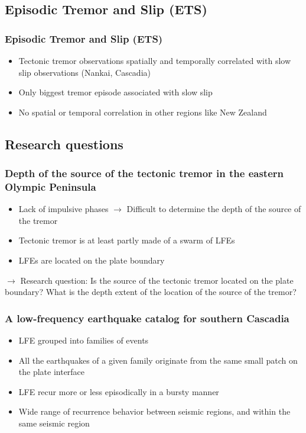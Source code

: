 \documentclass{beamer}
\begin{document}
	\subsection{Episodic Tremor and Slip (ETS)}

	\begin{frame}
		\frametitle{Episodic Tremor and Slip (ETS)}
		\begin{itemize}
			\item Tectonic tremor observations spatially and temporally correlated with slow slip observations (Nankai, Cascadia)
			\item Only biggest tremor episode associated with slow slip
			\item No spatial or temporal correlation in other regions like New Zealand
		\end{itemize}
	\end{frame}

	
	\subsection{Research questions}

	\begin{frame}
		\frametitle{Depth of the source of the tectonic tremor in the eastern Olympic Peninsula}
		\begin{itemize}
			\item Lack of impulsive phases $\rightarrow$ Difficult to determine the depth of the source of the tremor
			\item Tectonic tremor is at least partly made of a swarm of LFEs
			\item LFEs are located on the plate boundary
		\end{itemize}

		\begin{block}{}
			$\rightarrow$ Research question: Is the source of the tectonic tremor located on the plate boundary? What is the depth extent of the location of the source of the tremor?
		\end{block}
	\end{frame}

	\begin{frame}
		\frametitle{A low-frequency earthquake catalog for southern Cascadia}
		\begin{itemize}
			\item LFE grouped into families of events
			\item All the earthquakes of a given family originate from the same small patch on the plate interface
			\item LFE recur more or less episodically in a bursty manner
			\item Wide range of recurrence behavior between seismic regions, and within the same seismic region
		\end{itemize}
	\end{frame}
\end{document}
